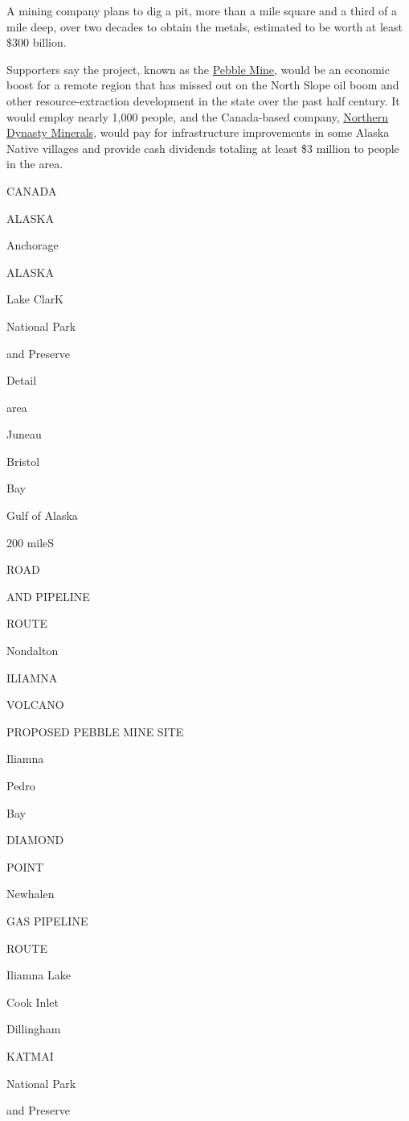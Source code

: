 A mining company plans to dig a pit, more than a mile square and a third
of a mile deep, over two decades to obtain the metals, estimated to be
worth at least \$300 billion.

Supporters say the project, known as the
\href{https://pebblepartnership.com/project-overview}{Pebble Mine},
would be an economic boost for a remote region that has missed out on
the North Slope oil boom and other resource-extraction development in
the state over the past half century. It would employ nearly 1,000
people, and the Canada-based company,
\href{https://www.northerndynastyminerals.com/}{Northern Dynasty
Minerals}, would pay for infrastructure improvements in some Alaska
Native villages and provide cash dividends totaling at least \$3 million
to people in the area.

CANADA

ALASKA

Anchorage

ALASKA

Lake ClarK

National Park

and Preserve

Detail

area

Juneau

Bristol

Bay

Gulf of Alaska

200 mileS

ROAD

AND PIPELINE

ROUTE

Nondalton

ILIAMNA

VOLCANO

PROPOSED PEBBLE MINE SITE

Iliamna

Pedro

Bay

DIAMOND

POINT

Newhalen

GAS PIPELINE

ROUTE

Iliamna Lake

Cook Inlet

Dillingham

KATMAI

National Park

and Preserve

